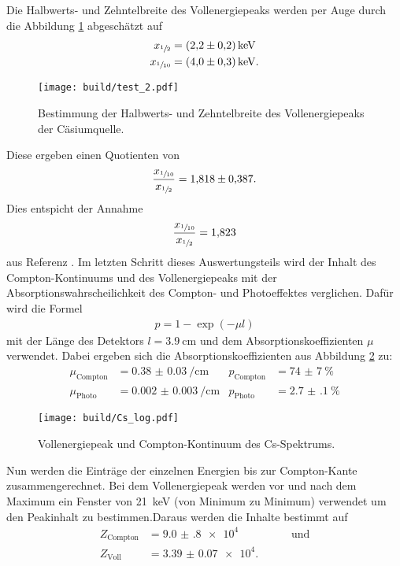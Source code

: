 Die Halbwerts- und Zehntelbreite des Vollenergiepeaks werden per Auge durch die Abbildung \ref{plt:halb}
abgeschätzt auf
\begin{align*}
  x_{\sfrac{1}{2}} &= \SI{2.2(2)}{\kilo\electronvolt} \\
  x_{\sfrac{1}{10}} &= \SI{4.0(3)}{\kilo\electronvolt}.
\end{align*}
\begin{figure}[htb]
  \centering
  \texttt{[image: build/test\_2.pdf]}
  \caption{Bestimmung der Halbwerts- und Zehntelbreite des Vollenergiepeaks der Cäsiumquelle.}
  \label{plt:halb}
\end{figure}
\FloatBarrier
Diese ergeben einen Quotienten von
\begin{align*}
  \frac{x_{\sfrac{1}{10}}}{x_{\sfrac{1}{2}}} = \num{1.818(387)}.
\end{align*}
Dies entspicht der Annahme
\begin{align*}
  \frac{x_{\sfrac{1}{10}}}{x_{\sfrac{1}{2}}} = \num{1.823}
\end{align*}
aus Referenz \cite{anleitung}.
Im letzten Schritt dieses Auswertungsteils wird der Inhalt des Compton-Kontinuums
und des Vollenergiepeaks mit der Absorptionswahrscheilichkeit des Compton- und
Photoeffektes verglichen. Dafür wird die Formel
\begin{align*}
	p = 1 - \exp\left(-\mu l\right)
\end{align*}
mit der Länge des Detektors $l = \SI{3.9}{\centi\meter}$ und dem
Absorptionskoeffizienten $\mu$ verwendet. Dabei ergeben sich die
Absorptionskoeffizienten aus Abbildung \ref{plt:Cs_abs} zu:
\begin{align*}
	\mu_\text{Compton} &= \SI{0.38(3)}{\per\centi\meter} & p_\text{Compton} &= \SI{74(7)}{\percent} \\
	\mu_\text{Photo} &= \SI{0.002(3)}{\per\centi\meter} & p_\text{Photo} &= \SI{2.7(1)}{\percent}
\end{align*}
\begin{figure}[htb]
  \centering
    \texttt{[image: build/Cs\_log.pdf]}
  \caption{Vollenergiepeak und Compton-Kontinuum des Cs-Spektrums.}
  \label{plt:Cs_abs}
\end{figure}
\FloatBarrier
Nun werden die Einträge der einzelnen Energien bis zur Compton-Kante zusammengerechnet.
Bei dem Vollenergiepeak werden vor und nach dem Maximum ein Fenster von \SI{21}{\kilo\electronvolt}
(von Minimum zu Minimum) verwendet um den Peakinhalt zu bestimmen.Daraus werden die
Inhalte bestimmt auf
\begin{align*}
  Z_\text{Compton} &= \num{9.0(8)e4} \hspace{2cm}\text{und}\\
  Z_\text{Voll} &= \num{3.39(7)e4}.
\end{align*}


